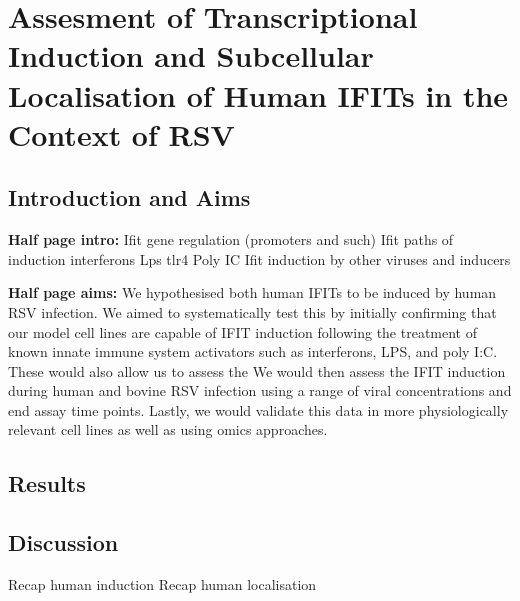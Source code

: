 \chapter{Assesment of Transcriptional Induction and Subcellular Localisation of Human IFITs in the Context of RSV} \label{Assesment of Transcriptional Induction and Subcellular Localisation of Human IFITs in the Context of RSV}
\section{Introduction and Aims} \label{Introduction and Aims-Chapter 1}
\textbf{Half page intro:}
Ifit gene regulation (promoters and such) \newline
Ifit paths of induction \newline
interferons \newline
Lps tlr4 \newline
Poly IC \newline
Ifit induction by other viruses and inducers \newline


\textbf{Half page aims:}
We hypothesised both human IFITs to be induced by human RSV infection. We aimed to systematically test this by initially confirming that our model cell lines are capable of IFIT induction following the treatment of known innate immune system activators such as interferons, LPS, and poly I:C. These would also allow us to assess the  We would then assess the IFIT induction during human and bovine RSV infection using a range of viral concentrations and end assay time points. Lastly, we would validate this data in more physiologically relevant cell lines as well as using omics approaches.

\section{Results} \label{Results-Chapter 1}




\section{Discussion} \label{Discussion Chapter 1}
Recap human induction \newline
Recap human localisation



